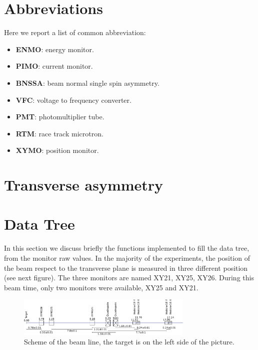 \begin{appendices}

\section{Abbreviations}

Here we report a list of common abbreviation:

\begin{itemize}
\item \textbf{ENMO}: energy monitor.
\item \textbf{PIMO}: current monitor.
\item \textbf{BNSSA}: beam normal single spin asymmetry.
\item \textbf{VFC}: voltage to frequency converter.
\item \textbf{PMT}: photomultiplier tube.
\item \textbf{RTM}: race track microtron.
\item \textbf{XYMO}: position monitor.
\end{itemize} 

\section{Transverse asymmetry}

\section{Data Tree}

In this section we discuss briefly the functions implemented to fill the data tree, from the monitor raw values. In the majority of the \transv experiments, the position of the beam respect to the transverse plane is measured in three different position (see next figure). The three monitors are named XY21, XY25, XY26. During this beam time, only two monitors were available, XY25 and XY21. 

\begin{figure}[hbtp]
\centering
\includegraphics[width = 0.75\textwidth]{figures/XYMOCalibBeamLine.pdf}
\caption{Scheme of the beam line, the target is on the left side of the picture.}
\end{figure}


\end{appendices}
